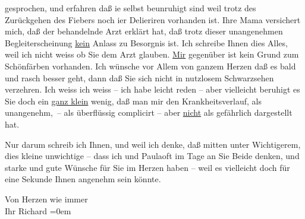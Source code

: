                gesprochen, und erfahren daß ie selbst beunruhigt
               sind weil trotz des Zurückgehen des Fiebers noch i{\geminationm}er
               Delieriren vorhanden ist. Ihre Mama versichert {\pb}mich, daß
               der behandelnde Arzt erklärt
               hat, daß trotz dieser unangenehmen Begleiterscheinung \uline{kein} Anlass zu Besorgnis ist. Ich schreibe Ihnen dies Alles, weil ich {\pb}nicht weiss ob Sie dem Arzt glauben. \uline{Mir} gegenüber ist kein Grund zum Schönfärben
               vorhanden. Ich wünsche vor Allem von ganzem Herzen daß es bald und rasch {\pb}besser geht, dann daß Sie sich
               nicht in nutzlosem Schwarzsehen  verzehren. Ich
               weiss ich weiss – ich habe leicht reden – aber vielleicht beruhigt es Sie doch ein
                  \uline{ganz klein} wenig, daß man mir den
               Krankheitsverlauf, als unangenehm, – als überflüssig complicirt – aber \uline{nicht} als gefährlich dargestellt hat.\pend
           
\pstart
           {\pb}Nur darum schreib ich Ihnen, und
               weil ich denke, daß mitten unter Wichtigerem, dies kleine unwichtige – dass ich und
                  Paulaoft im Tage an Sie Beide denken,
               und starke und gute Wünsche für Sie im Herzen haben – weil es vielleicht doch für
               eine Sekunde Ihnen angenehm sein könnte.\pend
           
\pstart
           Von Herzen wie immer{\\[\baselineskip]}Ihr \spacefill\mbox{Richard}\pend
           \leftskip=0em{}\endnumbering{}  \newcommand{\dateiname}{L01739}\newcommand{\titel}{Richard Beer-Hofmann an Arthur Schnitzler, [11. 12. 1907]}\newcommand{\editorInnen}{Martin Anton Müller und Gerd-Hermann Susen}
